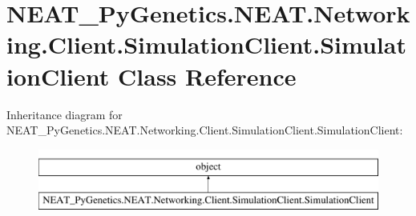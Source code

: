 \hypertarget{class_n_e_a_t___py_genetics_1_1_n_e_a_t_1_1_networking_1_1_client_1_1_simulation_client_1_1_simulation_client}{}\section{N\+E\+A\+T\+\_\+\+Py\+Genetics.\+N\+E\+A\+T.\+Networking.\+Client.\+Simulation\+Client.\+Simulation\+Client Class Reference}
\label{class_n_e_a_t___py_genetics_1_1_n_e_a_t_1_1_networking_1_1_client_1_1_simulation_client_1_1_simulation_client}
Inheritance diagram for N\+E\+A\+T\+\_\+\+Py\+Genetics.\+N\+E\+A\+T.\+Networking.\+Client.\+Simulation\+Client.\+Simulation\+Client\+:\begin{figure}[H]
\begin{center}
\leavevmode
\includegraphics[height=2.000000cm]{class_n_e_a_t___py_genetics_1_1_n_e_a_t_1_1_networking_1_1_client_1_1_simulation_client_1_1_simulation_client}
\end{center}
\end{figure}
